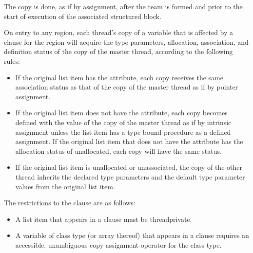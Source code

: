 \begin{fortranspecific}
The copy is done, as if by assignment, after the team is formed and prior to 
the start of execution of the associated structured block.

On entry to any  region, each thread's copy of a variable that 
is affected by a  clause for the  region will acquire 
the type parameters, allocation, association, and definition status of the copy
of the master thread, according to the following rules:

\begin{itemize}
\item If the original list item has the  attribute, each copy 
      receives the same association status as that of the copy of the master 
      thread as if by pointer assignment.
\item If the original list item does not have the 
      attribute, each copy becomes defined with the value of the copy of
      the master thread as if by intrinsic assignment unless the list item has
      a type bound procedure as a defined assignment.  If the original
      list item that does not have the  attribute has the
      allocation status of unallocated, each copy will have the same status.
\item If the original list item is unallocated or unassociated, the copy of
      the other thread inherits the declared type parameters and the default 
      type parameter values from the original list item.
\end{itemize}
\end{fortranspecific}

\restrictions
The restrictions to the  clause are as follows:

\begin{ccppspecific}
\begin{itemize}
\item A list item that appears in a  clause must be threadprivate.
\item A variable of class type (or array thereof) that appears in a  
      clause requires an accessible, unambiguous copy assignment operator for the 
      class type.
\end{itemize}
\end{ccppspecific}

